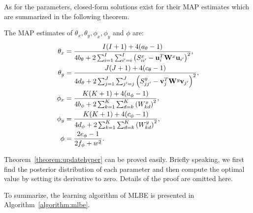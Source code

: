 As for the parameters, closed-form solutions exist for their \mbox{MAP} estimates which are summarized in the following theorem.
\begin{mythe}
\label{theorem:updatehyper}
The \mbox{MAP} estimates of $\theta_{x},\theta_{y},\phi_{x},\phi_{y}$ and $\phi$ are:
\begin{align}
\theta_{x} &=\frac{I(I+1)+4(a_{\theta}-1)}{4b_{\theta}+2\sum\nolimits_{i=1}^{I}\sum\nolimits_{i'=i}^{I}\left(S^{x}_{ii'}-{\bf u}_i^{T}{\bf W}^{x}{\bf u}_{i'}\right)^2},\label{theorem:updatethetax}\\
\theta_{y} &=\frac{J(J+1)+4(c_{\theta}-1)}{4d_{\theta}+2\sum\nolimits_{j=1}^{J}\sum\nolimits_{j'=j}^{J}\left(S^{y}_{jj'}-{\bf v}_j^{T}{\bf W}^{y}{\bf v}_{j'}\right)^2},\label{theorem:updatethetay}\\
\phi_{x} &=\frac{K(K+1)+4(a_{\phi}-1)}{4b_{\phi}+2\sum\nolimits_{k=1}^{K}\sum\nolimits_{d=k}^{K}\left(W^{x}_{kd}\right)^2},\label{theorem:updatephix}\\
\phi_{y} &=\frac{K(K+1)+4(c_{\phi}-1)}{4d_{\phi}+2\sum\nolimits_{k=1}^{K}\sum\nolimits_{d=k}^{K}\left(W^{y}_{kd}\right)^2},\label{theorem:updatephiy}\\
\phi &=\frac{2e_{\phi}-1}{2f_{\phi}+w^2}.\label{theorem:updatephi}
\end{align}

\end{mythe}

Theorem~\ref{theorem:updatehyper} can be proved easily. Briefly speaking, we first find the posterior distribution of each parameter and then compute the optimal value by setting its derivative to zero.  Details of the proof are omitted here.

To summarize, the learning algorithm of \mbox{MLBE} is presented in Algorithm~\ref{algorithm:mlbe}.


